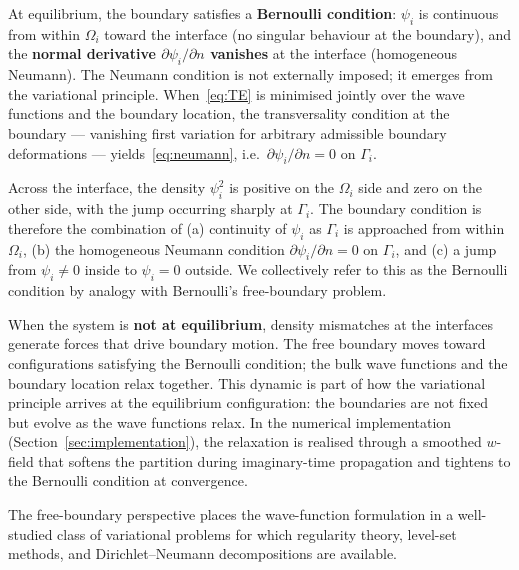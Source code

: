 \documentclass[11pt]{article}
\begin{document}
At equilibrium, the boundary satisfies a \textbf{Bernoulli condition}: $\psi_i$ is continuous from within $\Omega_i$ toward the interface (no singular behaviour at the boundary), and the \textbf{normal derivative $\partial \psi_i / \partial n$ vanishes} at the interface (homogeneous Neumann). The Neumann condition is not externally imposed; it emerges from the variational principle. When~\eqref{eq:TE} is minimised jointly over the wave functions and the boundary location, the transversality condition at the boundary --- vanishing first variation for arbitrary admissible boundary deformations --- yields~\eqref{eq:neumann}, i.e.\ $\partial \psi_i / \partial n = 0$ on $\Gamma_i$.

Across the interface, the density $\psi_i^2$ is positive on the $\Omega_i$ side and zero on the other side, with the jump occurring sharply at $\Gamma_i$. The boundary condition is therefore the combination of (a) continuity of $\psi_i$ as $\Gamma_i$ is approached from within $\Omega_i$, (b) the homogeneous Neumann condition $\partial \psi_i / \partial n = 0$ on $\Gamma_i$, and (c) a jump from $\psi_i \ne 0$ inside to $\psi_i = 0$ outside. We collectively refer to this as the Bernoulli condition by analogy with Bernoulli's free-boundary problem.

When the system is \textbf{not at equilibrium}, density mismatches at the interfaces generate forces that drive boundary motion. The free boundary moves toward configurations satisfying the Bernoulli condition; the bulk wave functions and the boundary location relax together. This dynamic is part of how the variational principle arrives at the equilibrium configuration: the boundaries are not fixed but evolve as the wave functions relax. In the numerical implementation (Section~\ref{sec:implementation}), the relaxation is realised through a smoothed $w$-field that softens the partition during imaginary-time propagation and tightens to the Bernoulli condition at convergence.

The free-boundary perspective places the wave-function formulation in a well-studied class of variational problems for which regularity theory, level-set methods, and Dirichlet--Neumann decompositions are available.
\end{document}
